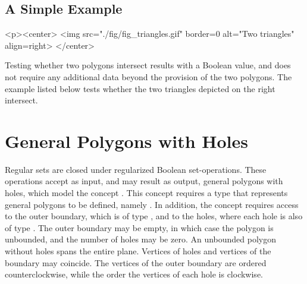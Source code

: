 \subsection{A Simple Example}
\label{bso_ssec:simple_example}
\lcTex{%
  \vspace{-20pt}
  \setlength{\widthRight}{1.4cm}
  \setlength{\widthLeft}{\widthLineReal}
  \addtolength{\widthLeft}{-\widthRight}
  \begin{minipage}{\widthLeft}
}
\label{fig:example}
\begin{ccHtmlOnly}
  <p><center>
    <img src="./fig/fig_triangles.gif" border=0 alt="Two triangles" align=right>
  </center>
\end{ccHtmlOnly}
Testing whether two polygons intersect results with a Boolean value, 
and does not require any additional data beyond the provision of the 
two polygons. The example listed below tests whether the two triangles 
depicted on the right intersect.

\lcTex{\vspace{-20pt}}

\section{General Polygons with Holes}
\label{bso_sec:general_polygons_with_holes}
Regular sets are closed under regularized Boolean set-operations.
These operations accept as input, and may result as output, general
polygons with holes, which model the concept 
. This concept requires a type that
represents general polygons to be defined, namely .
In addition, the concept requires access to the outer boundary, which is 
of type , and to the holes, where each hole is also 
of type . The outer boundary may be empty, in
which case the polygon is unbounded, and the number of holes may be zero. 
An unbounded polygon without holes spans the entire plane. Vertices of holes
and vertices of the boundary may coincide. The vertices of the outer
boundary are ordered counterclockwise, while the order the vertices
of each hole is clockwise.

